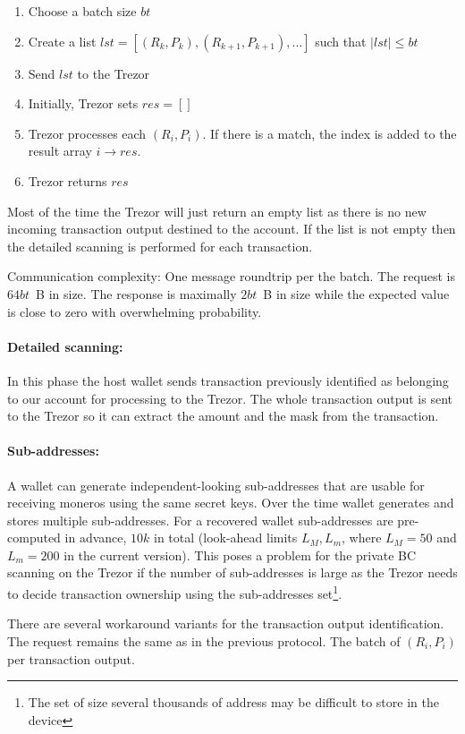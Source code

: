 \documentclass[]{article}
\begin{document}
\begin{enumerate}
	\item Choose a batch size $bt$
	\item Create a list $lst = [(R_k, P_k), (R_{k+1}, P_{k+1}), ...]$ such that $|lst| \leq bt$
	\item Send $lst$ to the Trezor
	\item Initially, Trezor sets $res = []$
	\item Trezor processes each $(R_i, P_i)$. If there is a match, the index is added to the result array $i \rightarrow res$.
	\item Trezor returns $res$ 
\end{enumerate}
Most of the time the Trezor will just return an empty list as there is no new incoming transaction output destined to the account. If the list is not empty then the detailed scanning is performed for each transaction. 

Communication complexity: One message roundtrip per the batch. The request is $64bt$~B in size. The response is maximally $2bt$~B in size while the expected value is close to zero with overwhelming probability. 

\paragraph{Detailed scanning:} In this phase the host wallet sends transaction previously identified as belonging to our account for processing to the Trezor. The whole transaction output is sent to the Trezor so it can extract the amount and the mask from the transaction.

\paragraph{Sub-addresses:}
A wallet can generate independent-looking sub-addresses that are usable for receiving moneros using the same secret keys. Over the time wallet generates and stores multiple sub-addresses. 
For a recovered wallet sub-addresses are pre-computed in advance, $10k$ in total (look-ahead limits $L_M, L_m$, where $L_M=50$ and $L_m=200$ in the current version).
This poses a problem for the private BC scanning on the Trezor if the number of sub-addresses is large as the Trezor needs to decide transaction ownership using the sub-addresses set\footnote{The set of size several thousands of address may be difficult to store in the device}.

There are several workaround variants for the transaction output identification. The request remains the same as in the previous protocol. The batch of $(R_i, P_i)$ per transaction output.
\end{document}
